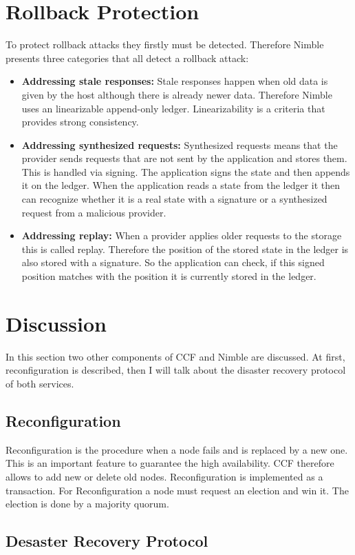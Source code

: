 \section{Rollback Protection}

To protect rollback attacks they firstly must be detected. Therefore Nimble presents three categories that all detect a rollback attack:
\begin{itemize}
	\item \textbf{Addressing stale responses:} Stale responses happen when old data is given by the host although there is already newer data. Therefore Nimble uses an linearizable append-only ledger. Linearizability is a criteria that provides strong consistency. 
	\item \textbf{Addressing synthesized requests:} Synthesized requests means that the provider sends requests that are not sent by the application and stores them. This is handled via signing. The application signs the state and then appends it on the ledger. When the application reads a state from the ledger it then can recognize whether it is a real state with a signature or a synthesized request from a malicious provider.
	\item \textbf{Addressing replay:} When a provider applies older requests to the storage this is called replay. Therefore the position of the stored state in the ledger is also stored with a signature. So the application can check, if this signed position matches with the position it is currently stored in the ledger.
\end{itemize}

\section{Discussion}
In this section two other components of CCF and Nimble are discussed. At first, reconfiguration is described, then I will talk about the disaster recovery protocol of both services.
\subsection{Reconfiguration}
\label{reconNimble}
Reconfiguration is the procedure when a node fails and is replaced by a new one. This is an important feature to guarantee the high availability. CCF therefore allows to add new or delete old nodes. Reconfiguration is implemented as a transaction. For Reconfiguration a node must request an election and win it. The election is done by a majority quorum. 
\subsection{Desaster Recovery Protocol}
